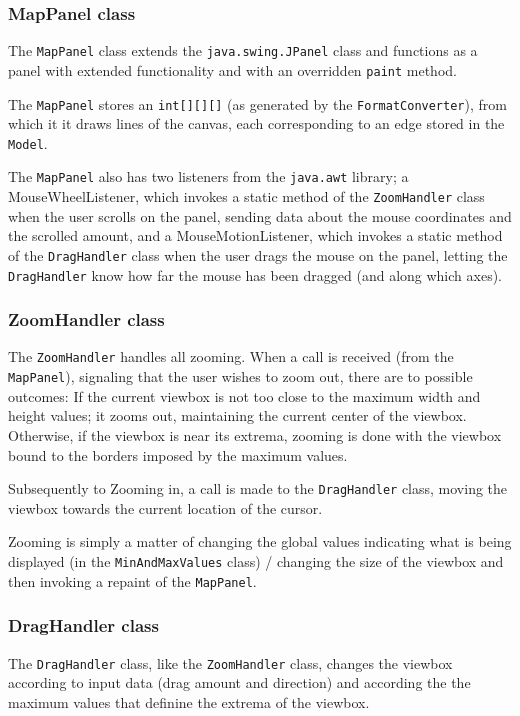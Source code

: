 \documentclass[a4paper,11pt]{article}
\begin{document}
\subsubsection{MapPanel class} %
The \texttt{MapPanel} class extends the \texttt{java.swing.JPanel} class and functions as a panel with extended functionality and with an overridden \texttt{paint} method.

The \texttt{MapPanel} stores an \texttt{int[][][]} (as generated by the \texttt{FormatConverter}), from which it it draws lines of the canvas, each corresponding to an edge stored in the \texttt{Model}.

The \texttt{MapPanel} also has two listeners from the \texttt{java.awt} library; a MouseWheelListener, which invokes a static method of the \texttt{ZoomHandler} class when the user scrolls on the panel, sending data about the mouse coordinates and the scrolled amount, and a MouseMotionListener, which invokes a static method of the \texttt{DragHandler} class when the user drags the mouse on the panel, letting the \texttt{DragHandler} know how far the mouse has been dragged (and along which axes).

\subsubsection{ZoomHandler class} %
The \texttt{ZoomHandler} handles all zooming. When a call is received (from the \texttt{MapPanel}), signaling that the user wishes to zoom out, there are to possible outcomes: If the current viewbox is not too close to the maximum width and height values; it zooms out, maintaining the current center of the viewbox. Otherwise, if the viewbox is near its extrema, zooming is done with the viewbox bound to the borders imposed by the maximum values.

Subsequently to Zooming in, a call is made to the \texttt{DragHandler} class, moving the viewbox towards the current location of the cursor.

Zooming is simply a matter of changing the global values indicating what is being displayed (in the \texttt{MinAndMaxValues} class) / changing the size of the viewbox and then invoking a repaint of the \texttt{MapPanel}.

\subsubsection{DragHandler class} %
The \texttt{DragHandler} class, like the \texttt{ZoomHandler} class, changes the viewbox according to input data (drag amount and direction) and according the the maximum values that definine the extrema of the viewbox.
\end{document}
